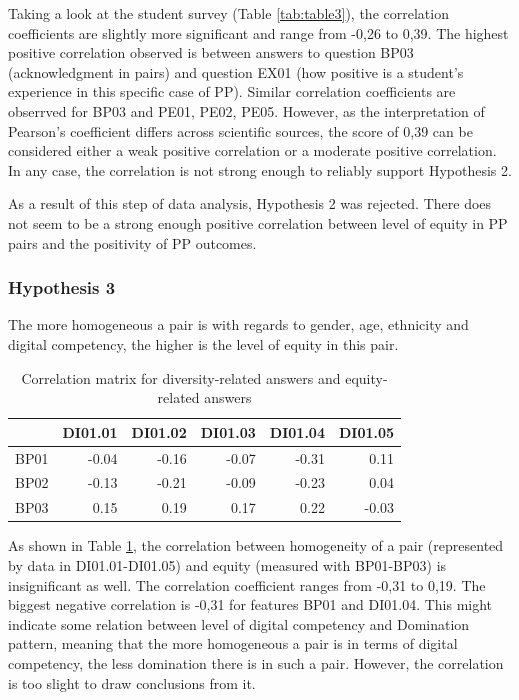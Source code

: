 \documentclass[conference]{IEEEtran}
\begin{document}
Taking a look at the student survey (Table \ref{tab:table3}), the correlation coefficients are slightly more significant and range from -0,26 to 0,39. The highest positive correlation observed is between answers to question BP03 (acknowledgment in pairs) and question EX01 (how positive is a student's experience in this specific case of PP). Similar correlation coefficients are obserrved for BP03 and PE01, PE02, PE05. However, as the interpretation of Pearson's coefficient differs across scientific sources, the score of 0,39 can be considered either a weak positive correlation or a moderate positive correlation. In any case, the correlation is not strong enough to reliably support Hypothesis 2.

As a result of this step of data analysis, Hypothesis 2 was rejected. There does not seem to be a strong enough positive correlation between level of equity in PP pairs and the positivity of PP outcomes. 

\subsubsection{Hypothesis 3}
The more homogeneous a pair is with regards to gender, age, ethnicity and digital competency, the higher is the level of equity in this pair.

\begin{table}[ht]
    \centering
    \begin{tabular}{|l|r|r|r|r|r|}
    \hline
    {} &   DI01.01 &   DI01.02 &   DI01.03 &   DI01.04 &   DI01.05 \\
    \hline
    BP01 & -0.04 & -0.16 & -0.07 & -0.31 &  0.11 \\
    \hline
    BP02 & -0.13 & -0.21 & -0.09 & -0.23 &  0.04 \\
    \hline
    BP03 &  0.15 &  0.19 &  0.17 &  0.22 & -0.03 \\
    \hline
    \end{tabular}
    \caption{Correlation matrix for diversity-related answers and equity-related answers}
    \label{tab:table4}
\end{table}

As shown in Table \ref{tab:table4}, the correlation between homogeneity of a pair (represented by data in DI01.01-DI01.05) and equity (measured with BP01-BP03) is insignificant as well. The correlation coefficient ranges from -0,31 to 0,19. The biggest negative correlation is -0,31 for features BP01 and DI01.04. This might indicate some relation between level of digital competency and Domination pattern, meaning that the more homogeneous a pair is in terms of digital competency, the less domination there is in such a pair. However, the correlation is too slight to draw conclusions from it.
\end{document}
